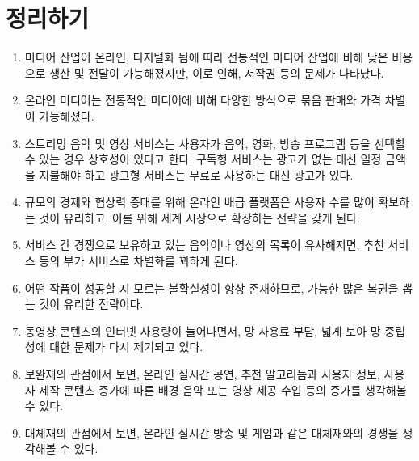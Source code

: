 \section*{정리하기}
\begin{enumerate}
\item 미디어 산업이 온라인, 디지털화 됨에 따라 전통적인 미디어 산업에 비해 낮은 비용으로 생산 및 전달이 가능해졌지만, 이로 인해, 저작권 등의 문제가 나타났다.
\item 온라인 미디어는 전통적인 미디어에 비해 다양한 방식으로 묶음 판매와 가격 차별이 가능해졌다.
\item 스트리밍 음악 및 영상 서비스는 사용자가 음악, 영화, 방송 프로그램 등을 선택할 수 있는 경우 상호성이 있다고 한다. 구독형 서비스는 광고가 없는 대신 일정 금액을 지불해야 하고 광고형 서비스는 무료로 사용하는 대신 광고가 있다. 
\item 규모의 경제와 협상력 증대를 위해 온라인 배급 플랫폼은 사용자 수를 많이 확보하는 것이 유리하고, 이를 위해 세계 시장으로 확장하는 전략을 갖게 된다.
\item 서비스 간 경쟁으로 보유하고 있는 음악이나 영상의 목록이 유사해지면, 추천 서비스 등의 부가 서비스로 차별화를 꾀하게 된다.
\item 어떤 작품이 성공할 지 모르는 불확실성이 항상 존재하므로, 가능한 많은 복권을 뽑는 것이 유리한 전략이다.
\item 동영상 콘텐츠의 인터넷 사용량이 늘어나면서, 망 사용료 부담, 넓게 보아 망 중립성에 대한 문제가 다시 제기되고 있다.
\item 보완재의 관점에서 보면, 온라인 실시간 공연, 추천 알고리듬과 사용자 정보, 사용자 제작 콘텐츠 증가에 따른 배경 음악 또는 영상 제공 수입 등의 증가를 생각해볼 수 있다.
\item 대체재의 관점에서 보면, 온라인 실시간 방송 및 게임과 같은 대체재와의 경쟁을 생각해볼 수 있다.
\end{enumerate}